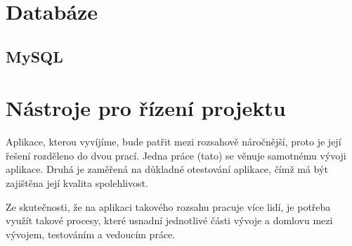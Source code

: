 \documentclass[czech,BP]{thesiskiv}
\begin{document}
\section{Databáze}
	\subsection{MySQL}
\section{Nástroje pro řízení projektu}
	\par Aplikace, kterou vyvíjíme, bude patřit mezi rozsahově náročnější, proto je její řešení rozděleno do dvou prací. Jedna práce (tato) se věnuje samotnému vývoji aplikace. Druhá je zaměřená na důkladné otestování aplikace, čímž má být zajištěna její kvalita spolehlivost.
	\par Ze skutečnosti, že na aplikaci takového rozsahu pracuje více lidí, je potřeba využít takové procesy, které usnadní jednotlivé části vývoje a domlovu mezi vývojem, testováním a vedoucím práce.
\end{document}
